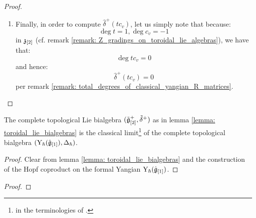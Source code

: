 \begin{proof}
\begin{enumerate}
                        \item Finally, in order to compute $\hat{\delta}^+(t c_v)$, let us simply note that because:
                            $$\deg t = 1, \deg c_v = -1$$
                        in $\mathfrak{z}_{[2]}$ (cf. remark \ref{remark: Z_gradings_on_toroidal_lie_algebras}), we have that:
                            $$\deg t c_v = 0$$
                        and hence:
                            $$\hat{\delta}^+(t c_v) = 0$$
                        per remark \ref{remark: total_degrees_of_classical_yangian_R_matrices}.
                    \end{enumerate}
                \end{proof}
            \begin{theorem} \label{theorem: toroidal_lie_algebras_as_classical_limits_of_affine_yangians}
                The complete topological Lie bialgebra $(\tilde{\mathfrak{g}}_{[2]}^+, \tilde{\delta}^+)$ as in lemma \ref{lemma: toroidal_lie_bialgebras} is the classical limit\footnote{ in the terminologies of \cite{etingof_kazhdan_quantisation_1}.} of the complete topological bialgebra $(\mathrm{Y}_{\hbar}(\hat{\mathfrak{g}}_{[1]}), \Delta_{\hbar})$.
            \end{theorem}
                \begin{proof}
                    Clear from lemma \ref{lemma: toroidal_lie_bialgebras} and the construction of the Hopf coproduct on the formal Yangian $\mathrm{Y}_{\hbar}(\hat{\mathfrak{g}}_{[1]})$. 
                \end{proof}
                
            \begin{definition} \label{def: parametrised_pseudo_quantisations}
                
            \end{definition}
            \begin{theorem} \label{theorem: parametrised_pseudo_classical_limits_of_affine_yangians}
                
            \end{theorem}
                \begin{proof}
                    
                \end{proof}

    
            
    \printbibliography

